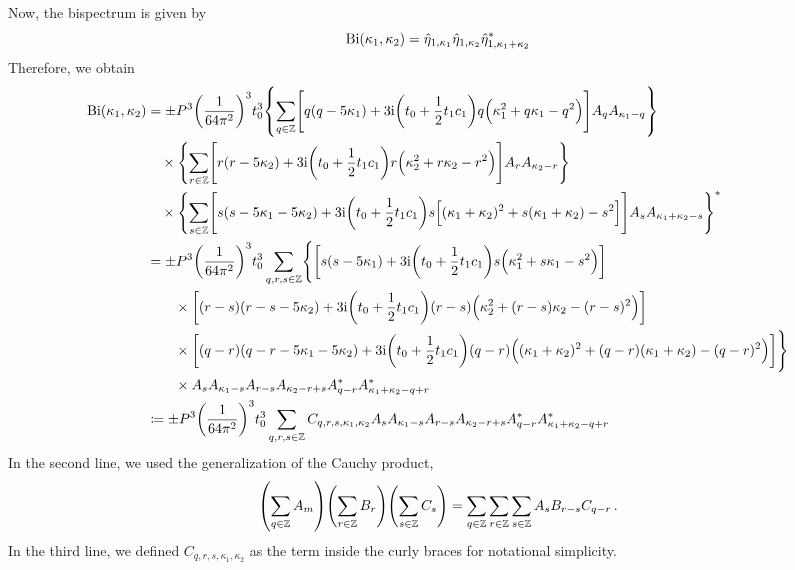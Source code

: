 \documentclass{jfm}
\newcommand{\im}{\mathrm{i}}
\begin{document}
Now, the bispectrum is given by
\[
  \mbox{Bi}(\kappa_1,\kappa_2) = \hat{\eta}_{1,\kappa_1}
  \hat{\eta}_{1,\kappa_2} \hat{\eta}_{1,\kappa_1+\kappa_2}^*
\]
Therefore, we obtain
\begin{align*}
  \Bi(\kappa_1,\kappa_2) &=
  \pm P^3 \pqty{\frac{1}{64\pi^2}}^3 t_0^3
  \Bqty{\sum_{q\in\mathbb{Z}} \Biggl[ q( q-5 \kappa_1)
    + 3 \im \pqty{t_0 + \frac{1}{2} t_1 c_1} q \Bigl(
      \kappa_1^2 + q \kappa_1 - q^2 \Bigr) \Biggr] A_q A_{\kappa_1-q}
  } \\
  &\quad \times
   \Bqty{\sum_{r\in\mathbb{Z}} \Biggl[ r( r-5 \kappa_2)
    + 3 \im \pqty{t_0 + \frac{1}{2} t_1 c_1} r \Bigl(
      \kappa_2^2 + r \kappa_2 - r^2 \Bigr) \Biggr] A_r A_{\kappa_2-r}
  } \\
  &\quad \times
  \Bqty{\sum_{s\in\mathbb{Z}} \Biggl[ s( s-5 \kappa_1 -5\kappa_2)
    + 3 \im \pqty{t_0 + \frac{1}{2} t_1 c_1} s \Bigl[
    (\kappa_1 + \kappa_2)^2 + s (\kappa_1+\kappa_2) - s^2 \Bigr] \Biggr]
    A_s A_{\kappa_1+\kappa_2-s}
  }^* \\
  &= \pm P^3 \pqty{\frac{1}{64\pi^2}}^3 t_0^3
  \sum_{q,r,s\in\mathbb{Z}} \Biggl\{
    \bqty{s( s-5 \kappa_1) + 3 \im \pqty{t_0 + \frac{1}{2} t_1 c_1} s
      \Bigl( \kappa_1^2 + s \kappa_1 - s^2 \Bigr)}
    \\ &\qquad\times
    \bqty{(r-s)(r-s-5 \kappa_2) + 3 \im \pqty{t_0 + \frac{1}{2} t_1 c_1}
      (r-s) \Bigl( \kappa_2^2 + (r-s) \kappa_2 - (r-s)^2 \Bigr)}
    \\ &\qquad\times
    \bqty{(q-r)(q-r-5 \kappa_1-5\kappa_2) + 3 \im \pqty{t_0 +
      \frac{1}{2} t_1 c_1} (q-r)
      \Bigl( (\kappa_1+\kappa_2)^2 + (q-r) (\kappa_1+\kappa_2) - (q-r)^2 \Bigr)}
  \Biggr\} \\
  &\qquad\times
  A_s A_{\kappa_1-s} A_{r-s} A_{\kappa_2-r+s} A^*_{q-r}
  A^*_{\kappa_1+\kappa_2-q+r} \\
 &\coloneqq
 \pm P^3 \pqty{\frac{1}{64\pi^2}}^3 t_0^3
  \sum_{q,r,s\in\mathbb{Z}}
  C_{q,r,s,\kappa_1,\kappa_2}
  A_s A_{\kappa_1-s} A_{r-s} A_{\kappa_2-r+s} A^*_{q-r}
  A^*_{\kappa_1+\kappa_2-q+r} \\
\end{align*}
In the second line, we used the generalization of the Cauchy product,
\[
  \pqty{\sum_{q\in\mathbb{Z}} A_m } \pqty{\sum_{r\in\mathbb{Z}} B_r}
  \pqty{\sum_{s\in\mathbb{Z}} C_s }
  = \sum_{q\in\mathbb{Z}} \sum_{r\in\mathbb{Z}} \sum_{s\in\mathbb{Z}} A_s
  B_{r-s} C_{q-r} \,.
\]
In the third line, we defined $C_{q,r,s,\kappa_1,\kappa_2}$ as the term
inside the curly braces for notational simplicity.
\end{document}
